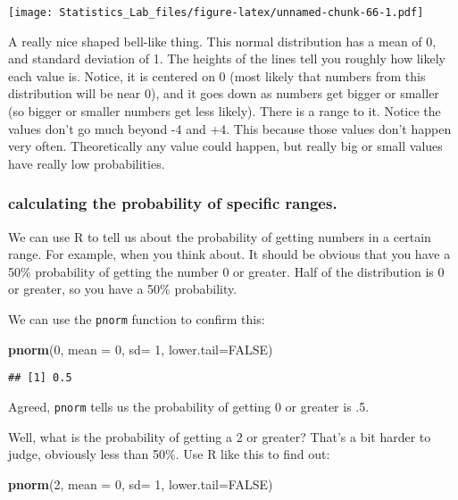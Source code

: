 \documentclass[
]{book}
\newenvironment{Shaded}{\begin{snugshade}}{\end{snugshade}}
\newcommand{\AttributeTok}[1]{\textcolor[rgb]{0.13,0.29,0.53}{#1}}
\newcommand{\ConstantTok}[1]{\textcolor[rgb]{0.56,0.35,0.01}{#1}}
\newcommand{\DecValTok}[1]{\textcolor[rgb]{0.00,0.00,0.81}{#1}}
\newcommand{\FunctionTok}[1]{\textcolor[rgb]{0.13,0.29,0.53}{\textbf{#1}}}
\newcommand{\NormalTok}[1]{#1}
\begin{document}
\texttt{[image: Statistics\_Lab\_files/figure-latex/unnamed-chunk-66-1.pdf]}

A really nice shaped bell-like thing. This normal distribution has a
mean of 0, and standard deviation of 1. The heights of the lines tell
you roughly how likely each value is. Notice, it is centered on 0 (most
likely that numbers from this distribution will be near 0), and it goes
down as numbers get bigger or smaller (so bigger or smaller numbers get
less likely). There is a range to it. Notice the values don't go much
beyond -4 and +4. This because those values don't happen very often.
Theoretically any value could happen, but really big or small values
have really low probabilities.

\hypertarget{calculating-the-probability-of-specific-ranges.}{%
\subsubsection{calculating the probability of specific ranges.}\label{calculating-the-probability-of-specific-ranges.}}

We can use R to tell us about the probability of getting numbers in a
certain range. For example, when you think about. It should be obvious
that you have a 50\% probability of getting the number 0 or greater. Half
of the distribution is 0 or greater, so you have a 50\% probability.

We can use the \texttt{pnorm} function to confirm this:

\begin{Shaded}
\begin{Highlighting}[]
\FunctionTok{pnorm}\NormalTok{(}\DecValTok{0}\NormalTok{, }\AttributeTok{mean =} \DecValTok{0}\NormalTok{, }\AttributeTok{sd=} \DecValTok{1}\NormalTok{, }\AttributeTok{lower.tail=}\ConstantTok{FALSE}\NormalTok{)}
\end{Highlighting}
\end{Shaded}

\begin{verbatim}
## [1] 0.5
\end{verbatim}

Agreed, \texttt{pnorm} tells us the probability of getting 0 or greater is .5.

Well, what is the probability of getting a 2 or greater? That's a bit
harder to judge, obviously less than 50\%. Use R like this to find out:

\begin{Shaded}
\begin{Highlighting}[]
\FunctionTok{pnorm}\NormalTok{(}\DecValTok{2}\NormalTok{, }\AttributeTok{mean =} \DecValTok{0}\NormalTok{, }\AttributeTok{sd=} \DecValTok{1}\NormalTok{, }\AttributeTok{lower.tail=}\ConstantTok{FALSE}\NormalTok{)}
\end{Highlighting}
\end{Shaded}
\end{document}
